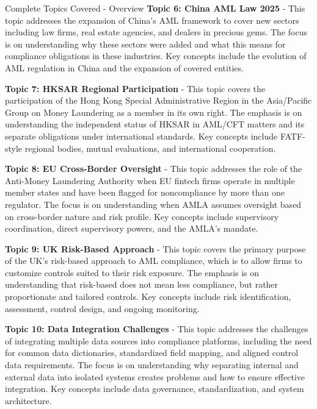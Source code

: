 \documentclass[8pt]{beamer}  %
\begin{document}
\begin{frame}{Complete Topics Covered - Overview}
		\vspace{0.2cm}
		\textbf{Topic 6: China AML Law 2025} - This topic addresses the expansion of China's AML framework to cover new sectors including law firms, real estate agencies, and dealers in precious gems. The focus is on understanding why these sectors were added and what this means for compliance obligations in these industries. Key concepts include the evolution of AML regulation in China and the expansion of covered entities.
		
		\vspace{0.2cm}
		\textbf{Topic 7: HKSAR Regional Participation} - This topic covers the participation of the Hong Kong Special Administrative Region in the Asia/Pacific Group on Money Laundering as a member in its own right. The emphasis is on understanding the independent status of HKSAR in AML/CFT matters and its separate obligations under international standards. Key concepts include FATF-style regional bodies, mutual evaluations, and international cooperation.
		
		\vspace{0.2cm}
		\textbf{Topic 8: EU Cross-Border Oversight} - This topic addresses the role of the Anti-Money Laundering Authority when EU fintech firms operate in multiple member states and have been flagged for noncompliance by more than one regulator. The focus is on understanding when AMLA assumes oversight based on cross-border nature and risk profile. Key concepts include supervisory coordination, direct supervisory powers, and the AMLA's mandate.
		
		\vspace{0.2cm}
		\textbf{Topic 9: UK Risk-Based Approach} - This topic covers the primary purpose of the UK's risk-based approach to AML compliance, which is to allow firms to customize controls suited to their risk exposure. The emphasis is on understanding that risk-based does not mean less compliance, but rather proportionate and tailored controls. Key concepts include risk identification, assessment, control design, and ongoing monitoring.
		
		\vspace{0.2cm}
		\textbf{Topic 10: Data Integration Challenges} - This topic addresses the challenges of integrating multiple data sources into compliance platforms, including the need for common data dictionaries, standardized field mapping, and aligned control data requirements. The focus is on understanding why separating internal and external data into isolated systems creates problems and how to ensure effective integration. Key concepts include data governance, standardization, and system architecture.
		

\end{frame}
\end{document}
